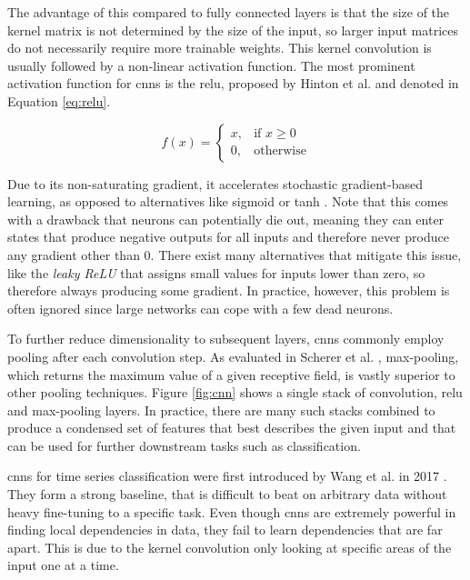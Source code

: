 The advantage of this compared to fully connected layers is that the size of the kernel matrix is not determined by the size of the input, so larger input matrices do not necessarily require more trainable weights. This kernel convolution is usually followed by a non-linear activation function. The most prominent activation function for \glspl{cnn} is the \gls{relu}, proposed by Hinton et al. \cite{icml2010relu} and denoted in Equation \ref{eq:relu}.

\begin{equation}
   f(x)= 
    \begin{cases}
        x,& \text{if } x\ge 0\\
        0,              & \text{otherwise}
    \end{cases}
   \label{eq:relu}
\end{equation}

Due to its non-saturating gradient, it accelerates stochastic gradient-based learning, as opposed to alternatives like sigmoid or tanh \cite{NIPS2012_4824}. Note that this comes with a drawback that neurons can potentially die out, meaning they can enter states that produce negative outputs for all inputs and therefore never produce any gradient other than 0. There exist many alternatives that mitigate this issue, like the \textit{leaky ReLU} that assigns small values for inputs lower than zero, so therefore always producing some gradient. In practice, however, this problem is often ignored since large networks can cope with a few dead neurons.

To further reduce dimensionality to subsequent layers, \glspl{cnn} commonly employ pooling after each convolution step. As evaluated in Scherer et al. \cite{scherer2010maxpool}, max-pooling, which returns the maximum value of a given receptive field, is vastly superior to other pooling techniques. Figure \ref{fig:cnn} shows a single stack of convolution, \gls{relu} and max-pooling layers. In practice, there are many such stacks combined to produce a condensed set of features that best describes the given input and that can be used for further downstream tasks such as classification.

\glspl{cnn} for time series classification were first introduced by Wang et al. in 2017 \cite{wang2016time}. They form a strong baseline, that is difficult to beat on arbitrary data without heavy fine-tuning to a specific task. Even though \glspl{cnn} are extremely powerful in finding local dependencies in data, they fail to learn dependencies that are far apart. This is due to the kernel convolution only looking at specific areas of the input one at a time.

